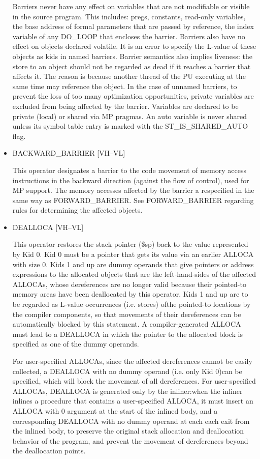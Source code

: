 \documentclass{article}
\begin{document}
\begin{itemize}
Barriers never have any effect on variables that are not
modifiable or visible in the source program. This includes: pregs,
constants, read-only variables, the base address of formal parameters
that are passed by reference, the index variable of any
DO\_LOOP that encloses the barrier. Barriers also have no effect
on objects declared volatile. It is an error to
specify the L-value of these objects as kids in named barriers.
Barrier semantics also implies liveness: the store to an object
should not be regarded as dead if it reaches a barrier that affects
it. The reason is because another thread of the PU executing at the
same time may reference the object. In the case of unnamed barriers,
to prevent the loss of too many optimization opportunities, private
variables are excluded from being affected by the barrier. Variables
are declared to be private (local) or shared via MP pragmas. An auto
variable is never shared unless its symbol table entry is marked
with the ST\_IS\_SHARED\_AUTO flag. \item  BACKWARD\_BARRIER \hfill [VH--VL]

This operator designates a barrier to the code movement of memory
access instructions in the backward direction (against the flow
of control),
used for MP support. The memory accesses affected by the barrier
a respecified in the same way as
FORWARD\_BARRIER. See FORWARD\_BARRIER regarding rules for determining
the affected objects.

\item  DEALLOCA \hfill [VH--VL]

This operator restores the stack pointer (\$sp) back to the value
represented by Kid 0. Kid 0 must be a pointer that gets its value
via an earlier
ALLOCA with size 0. Kids 1 and up are dummy operands that give
pointers or address expressions to the allocated objects that are
the left-hand-sides
of the affected ALLOCAs, whose dereferences are no longer valid
because their pointed-to memory areas have been deallocated by this
operator. Kids 1 and up are to be regarded as L-value occurrences
(i.e. stores) ofthe pointed-to locations by the compiler components,
so that movements of their dereferences can be automatically blocked
by this statement. A compiler-generated
ALLOCA must lead to a DEALLOCA in which the pointer to the allocated
block is specified as one of the dummy operands.

For user-specified ALLOCAs, since the affected dereferences cannot
be easily collected, a
DEALLOCA with no dummy operand (i.e. only Kid 0)can be specified,
which will block the movement of all dereferences. For
user-specified ALLOCAs, DEALLOCA is generated only by the inliner:when
the inliner inlines a procedure that contains a user-specified
ALLOCA, it must insert an ALLOCA with 0 argument at the start of
the inlined body, and a corresponding
DEALLOCA with no dummy operand at each
each exit from the inlined body, to preserve the original stack
allocation and deallocation behavior of the program, and prevent
the movement of dereferences beyond the deallocation points.

\end{itemize}
\end{document}
